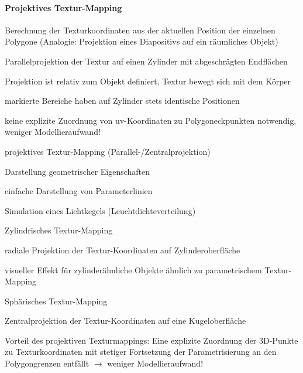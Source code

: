 \documentclass[landscape]{article}
\begin{document}
\begin{multicols}{3}
  \paragraph{Projektives Textur-Mapping}
  Berechnung der Texturkoordinaten aus der aktuellen Position der einzelnen Polygone (Analogie: Projektion eines Diapositivs auf ein räumliches Objekt)
  \begin{itemize*}
    \item Parallelprojektion der Textur auf einen Zylinder mit abgeschrägten Endflächen
    \item Projektion ist relativ zum Objekt definiert, Textur bewegt sich mit dem Körper
    \item markierte Bereiche haben auf Zylinder stets identische Positionen
    \item keine explizite Zuordnung von uv-Koordinaten zu Polygoneckpunkten notwendig, weniger Modellieraufwand!
  \end{itemize*}
  \begin{description*}  
    \item[projektives Textur-Mapping (Parallel-/Zentralprojektion)]
    \begin{itemize*}
      \item Darstellung geometrischer Eigenschaften
      \item einfache Darstellung von Parameterlinien 
      \item Simulation eines Lichtkegels (Leuchtdichteverteilung)
    \end{itemize*}
    \item[Zylindrisches Textur-Mapping]
    \begin{itemize*}
      \item radiale Projektion der Textur-Koordinaten auf Zylinderoberfläche
      \item visueller Effekt für zylinderähnliche Objekte ähnlich zu parametrischem Textur-Mapping
    \end{itemize*}
    \item[Sphärisches Textur-Mapping]
    \begin{itemize*}
      \item Zentralprojektion der Textur-Koordinaten auf eine Kugeloberfläche
      \item Vorteil des projektiven Texturmappings: Eine explizite Zuordnung der 3D-Punkte zu Texturkoordinaten mit stetiger Fortsetzung der Parametrisierung an den Polygongrenzen entfällt $\rightarrow$ weniger Modellieraufwand!
    \end{itemize*}
  \end{description*}
  

\end{multicols}
\end{document}
